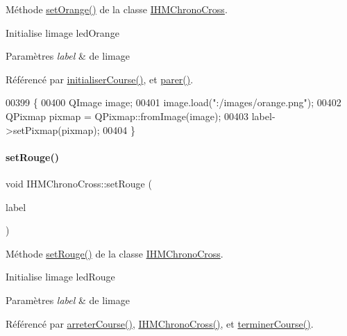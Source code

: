 Méthode \hyperlink{class_i_h_m_chrono_cross_a7e2424925f588d7a1914befc3c6c832e}{set\+Orange()} de la classe \hyperlink{class_i_h_m_chrono_cross}{I\+H\+M\+Chrono\+Cross}. 

Initialise l\textquotesingle{}image led\+Orange 
\begin{DoxyParams}{Paramètres}
{\em label} & de l\textquotesingle{}image \\
\hline
\end{DoxyParams}


Référencé par \hyperlink{class_i_h_m_chrono_cross_adde019cc3799befac3fd9555e392eab9}{initialiser\+Course()}, et \hyperlink{class_i_h_m_chrono_cross_aa272ffa273fc8c487ea64ef6a43b4439}{parer()}.


\begin{DoxyCode}
00399 \{
00400     QImage image;
00401     image.load(\textcolor{stringliteral}{":/images/orange.png"});
00402     QPixmap pixmap = QPixmap::fromImage(image);
00403     label->setPixmap(pixmap);
00404 \}
\end{DoxyCode}
\mbox{\label{class_i_h_m_chrono_cross_a3b46a31326bdde2b5ad67a9f0a6de76b}} 
\paragraph{\texorpdfstring{set\+Rouge()}{setRouge()}}
{\footnotesize\ttfamily void I\+H\+M\+Chrono\+Cross\+::set\+Rouge (\begin{DoxyParamCaption}\item[{Q\+Label $\ast$}]{label }\end{DoxyParamCaption})\hspace{0.3cm}{\ttfamily [private]}}



Méthode \hyperlink{class_i_h_m_chrono_cross_a3b46a31326bdde2b5ad67a9f0a6de76b}{set\+Rouge()} de la classe \hyperlink{class_i_h_m_chrono_cross}{I\+H\+M\+Chrono\+Cross}. 

Initialise l\textquotesingle{}image led\+Rouge 
\begin{DoxyParams}{Paramètres}
{\em label} & de l\textquotesingle{}image \\
\hline
\end{DoxyParams}


Référencé par \hyperlink{class_i_h_m_chrono_cross_ad3d8f287d08dd9aa0c6b10c9973672a4}{arreter\+Course()}, \hyperlink{class_i_h_m_chrono_cross_a479fc90733fba3e65fb06aa4a3adc02e}{I\+H\+M\+Chrono\+Cross()}, et \hyperlink{class_i_h_m_chrono_cross_ac89c6ec3040e8b787f1fbdb670405023}{terminer\+Course()}.


